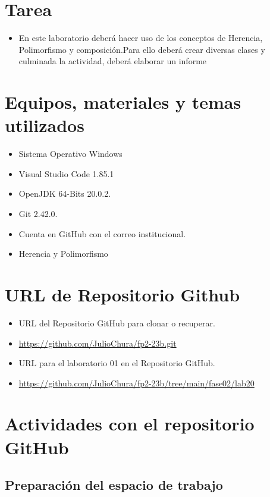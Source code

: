\documentclass{article}
\begin{document}
	\section{Tarea}
	\begin{itemize}		
		\item En este laboratorio deberá hacer uso de los conceptos de Herencia, Polimorfismo y composición.Para ello deberá crear diversas clases y culminada la actividad, deberá elaborar un informe 
	\end{itemize}
	
	\section{Equipos, materiales y temas utilizados}
	\begin{itemize}
		\item Sistema Operativo Windows
		\item Visual Studio Code 1.85.1
		\item OpenJDK 64-Bits 20.0.2.
		\item Git 2.42.0.
		\item Cuenta en GitHub con el correo institucional.
		\item Herencia y Polimorfismo
	\end{itemize}
	
	\section{URL de Repositorio Github}
	\begin{itemize}
		\item URL del Repositorio GitHub para clonar o recuperar.
		\item \url{https://github.com/JulioChura/fp2-23b.git}
		\item URL para el laboratorio 01 en el Repositorio GitHub.
		\item \url{https://github.com/JulioChura/fp2-23b/tree/main/fase02/lab20}
	\end{itemize}
	
	\section{Actividades con el repositorio GitHub}
	
	
	
	
	
	
	
	\subsection{Preparación del espacio de trabajo}
	
\end{document}
